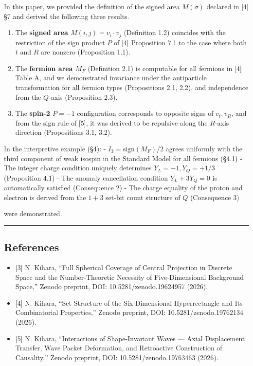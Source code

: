 \documentclass[
  a4paper,11pt]{article}
\providecommand{\tightlist}{%
  \setlength{\itemsep}{0pt}\setlength{\parskip}{0pt}}
\begin{document}
In this paper, we provided the definition of the signed area
\(M(\sigma)\) declared in {[}4{]} §7 and derived the following three
results.

\begin{enumerate}
\def\labelenumi{\arabic{enumi}.}
\tightlist
\item
  The \textbf{signed area \(M(i,j) = v_i \cdot v_j\)} (Definition 1.2)
  coincides with the restriction of the sign product \(P\) of {[}4{]}
  Proposition 7.1 to the case where both \(t\) and \(R\) are nonzero
  (Proposition 1.1).
\item
  The \textbf{fermion area \(M_F\)} (Definition 2.1) is computable for
  all fermions in {[}4{]} Table A, and we demonstrated invariance under
  the antiparticle transformation for all fermion types (Propositions
  2.1, 2.2), and independence from the \(Q\)-axis (Proposition 2.3).
\item
  The \textbf{spin-2 \(P = -1\)} configuration corresponds to opposite
  signs of \(v_t, v_R\), and from the sign rule of {[}5{]}, it was
  derived to be repulsive along the \(R\)-axis direction (Propositions
  3.1, 3.2).
\end{enumerate}

In the interpretive example (§4): - \(I_3 = \text{sign}(M_F)/2\) agrees
uniformly with the third component of weak isospin in the Standard Model
for all fermions (§4.1) - The integer charge condition uniquely
determines \(Y_L = -1, Y_Q = +1/3\) (Proposition 4.1) - The anomaly
cancellation condition \(Y_L + 3Y_Q = 0\) is automatically satisfied
(Consequence 2) - The charge equality of the proton and electron is
derived from the \(1+3\) set-bit count structure of \(Q\) (Consequence
3)

were demonstrated.

\begin{center}\rule{0.5\linewidth}{0.5pt}\end{center}

\subsection{References}\label{references}

\begin{itemize}
\tightlist
\item
  {[}3{]} N. Kihara, ``Full Spherical Coverage of Central Projection in
  Discrete Space and the Number-Theoretic Necessity of Five-Dimensional
  Background Space,'' Zenodo preprint, DOI: 10.5281/zenodo.19624957
  (2026).
\item
  {[}4{]} N. Kihara, ``Set Structure of the Six-Dimensional
  Hyperrectangle and Its Combinatorial Properties,'' Zenodo preprint,
  DOI: 10.5281/zenodo.19762134 (2026).
\item
  {[}5{]} N. Kihara, ``Interactions of Shape-Invariant Waves --- Axial
  Displacement Transfer, Wave Packet Deformation, and Retroactive
  Construction of Causality,'' Zenodo preprint, DOI:
  10.5281/zenodo.19763463 (2026).
\end{itemize}
\end{document}

